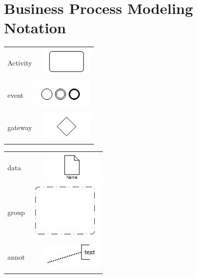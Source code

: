 
\section{Business Process Modeling Notation}
\begin{tabular}{lr}

Activity & \includegraphics{pic/activity.png}\\
event & \includegraphics{pic/event.png}\\
gateway & \includegraphics{pic/gateway.png}\\
\end{tabular}

\begin{tabular}{lr}
data&\includegraphics{pic/data.png}\\
group&\includegraphics{pic/group.png}\\
annot&\includegraphics{pic/annotation.png}\\
\end{tabular}

